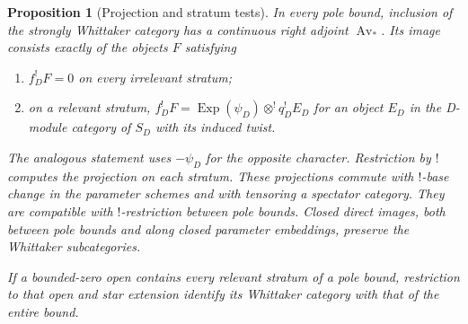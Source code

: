 \documentclass[11pt]{article}
\numberwithin{equation}{section}
\newtheorem{proposition}[theorem]{Proposition}
\theoremstyle{definition}
\theoremstyle{remark}
\begin{document}
\begin{proposition}[Projection and stratum tests]
\label{whittaker:strata-properties}
In every pole bound, inclusion of the strongly Whittaker category has a
continuous right adjoint $\operatorname{Av}_*$. Its image consists exactly
of the objects $F$ satisfying
\begin{enumerate}
\item $f_D^!F=0$ on every irrelevant stratum;
\item on a relevant stratum,
$f_D^!F=\operatorname{Exp}(\psi_D)\otimes^!q_D^!E_D$ for an object $E_D$
in the D-module category of $S_D$ with its induced twist.
\end{enumerate}
The analogous statement uses $-\psi_D$ for the opposite character.
Restriction by $!$ computes the projection on each stratum. These
projections commute with $!$-base change in the parameter schemes and
with tensoring a spectator category. They are compatible with
$!$-restriction between pole bounds. Closed direct images, both between
pole bounds and along closed parameter embeddings, preserve the
Whittaker subcategories.

If a bounded-zero open contains every relevant stratum of a pole bound,
restriction to that open and star extension identify its Whittaker
category with that of the entire bound.
\end{proposition}
\end{document}
